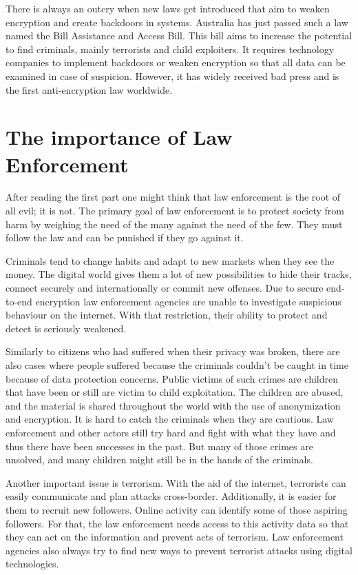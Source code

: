 \documentclass[12pt]{article}
\begin{document}
There is always an outcry when new laws get introduced that aim to weaken encryption and create backdoors in systems. Australia has just passed such a law named the Bill Assistance and Access Bill. \cite{auBill} This bill aims to increase the potential to find criminals, mainly terrorists and child exploiters.  It requires technology companies to implement backdoors or weaken encryption so that all data can be examined in case of suspicion. However, it has widely received bad press and is the first anti-encryption law worldwide. \cite{auBillBad, auBillVeryBad}

\section*{The importance of Law Enforcement}

After reading the first part one might think that law enforcement is the root of all evil; it is not. The primary goal of law enforcement is to protect society from harm by weighing the need of the many against the need of the few. They must follow the law and can be punished if they go against it. \cite{policework}

Criminals tend to change habits and adapt to new markets when they see the money. The digital world gives them a lot of new possibilities to hide their tracks, connect securely and internationally or commit new offenses. Due to secure end-to-end encryption law enforcement agencies are unable to investigate suspicious behaviour on the internet. With that restriction, their ability to protect and detect is seriously weakened. \cite{jabe2017}

Similarly to citizens who had suffered when their privacy was broken, there are also cases where people suffered because the criminals couldn't be caught in time because of data protection concerns. Public victims of such crimes are children that have been or still are victim to child exploitation. The children are abused, and the material is shared throughout the world with the use of anonymization and encryption. It is hard to catch the criminals when they are cautious. Law enforcement and other actors still try hard and fight with what they have and thus there have been successes in the past. \cite{antipedo} But many of those crimes are unsolved, and many children might still be in the hands of the criminals. \cite{crimesAgainstChildren}

Another important issue is terrorism. With the aid of the internet, terrorists can easily communicate and plan attacks cross-border. Additionally, it is easier for them to recruit new followers. Online activity can identify some of those aspiring followers. \cite{phasenRadikalisierung} For that, the law enforcement needs access to this activity data so that they can act on the information and prevent acts of terrorism. \cite{terrorism} Law enforcement agencies also always try to find new ways to prevent terrorist attacks using digital technologies. \cite{meetupTerrorism}
\end{document}
